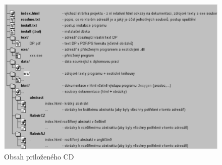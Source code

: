 \documentclass[12pt,twoside,a4paper]{book}   %
\begin{document}
\begin{figure}[h]
\begin{center}
\includegraphics[width=14cm]{figures/seznamcd}
\caption{Obsah priloženého CD}
\label{fig:seznamcd}
\end{center}
\end{figure}
\end{document}
